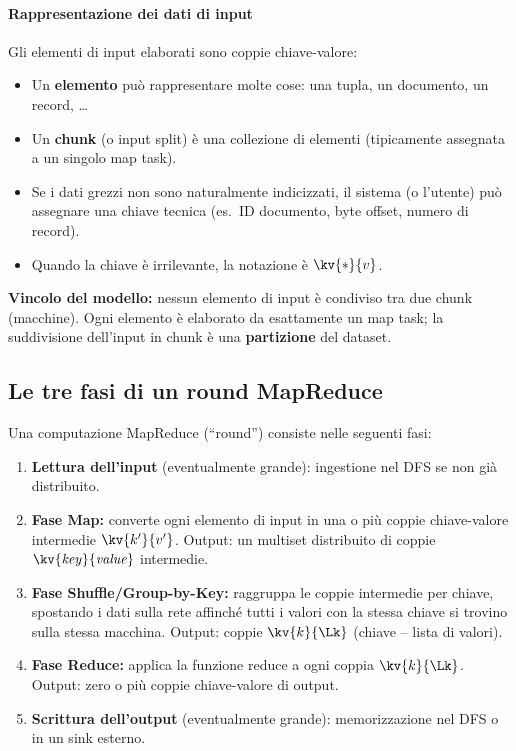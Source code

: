 \paragraph{Rappresentazione dei dati di input}

Gli elementi di input elaborati sono coppie chiave-valore:
\begin{itemize}
  \item Un \textbf{elemento} può rappresentare molte cose: una tupla,
    un documento, un record, \ldots
  \item Un \textbf{chunk} (o input split) è una collezione di elementi
    (tipicamente assegnata a un singolo map task).
  \item Se i dati grezzi non sono naturalmente indicizzati, il sistema
    (o l'utente) può assegnare una chiave tecnica (es.\ ID documento,
    byte offset, numero di record).
  \item Quando la chiave è irrilevante, la notazione è $\kv{*}{v}$.
\end{itemize}

\begin{importante}
  \textbf{Vincolo del modello:} nessun elemento di input è condiviso tra due
  chunk (macchine). Ogni elemento è elaborato da esattamente un map task;
  la suddivisione dell'input in chunk è una \textbf{partizione} del dataset.
\end{importante}

\subsection{Le tre fasi di un round MapReduce}

Una computazione MapReduce (``round'') consiste nelle seguenti fasi:

\begin{enumerate}
  \item \textbf{Lettura dell'input} (eventualmente grande):
    ingestione nel DFS se non già distribuito.
  \item \textbf{Fase Map:} converte ogni elemento di input in una o più
    coppie chiave-valore intermedie $\kv{k'}{v'}$.
    Output: un multiset distribuito di coppie $\kv{\mathit{key}}{\mathit{value}}$ intermedie.
  \item \textbf{Fase Shuffle/Group-by-Key:} raggruppa le coppie intermedie
    per chiave, spostando i dati sulla rete affinché tutti i valori con la
    stessa chiave si trovino sulla stessa macchina.
    Output: coppie $\kv{k}{\Lk}$ (chiave -- lista di valori).
  \item \textbf{Fase Reduce:} applica la funzione reduce a ogni coppia
    $\kv{k}{\Lk}$.
    Output: zero o più coppie chiave-valore di output.
  \item \textbf{Scrittura dell'output} (eventualmente grande):
    memorizzazione nel DFS o in un sink esterno.
\end{enumerate}

